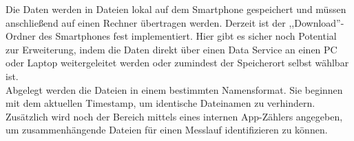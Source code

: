 Die Daten werden in Dateien lokal auf dem Smartphone gespeichert und müssen anschließend auf einen Rechner übertragen werden. Derzeit ist der ,,Download''-Ordner des Smartphones fest implementiert. Hier gibt es sicher noch Potential zur Erweiterung, indem die Daten direkt über einen Data Service an einen PC oder Laptop weitergeleitet werden oder zumindest der Speicherort selbst wählbar ist. \\
Abgelegt werden die Dateien in einem bestimmten Namensformat. Sie beginnen mit dem aktuellen Timestamp, um identische Dateinamen zu verhindern. Zusätzlich wird noch der Bereich mittels eines internen App-Zählers angegeben, um zusammenhängende Dateien für einen Messlauf identifizieren zu können.